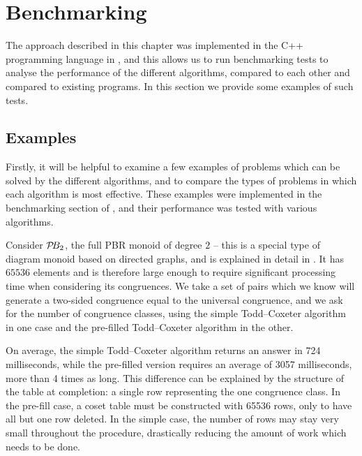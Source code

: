 \section{Benchmarking}
\label{sec:benchmarking}

The approach described in this chapter was implemented in the C++ programming
language in \libsemigroups{} \cite{libsemigroups}, and this allows us to
run benchmarking tests to analyse the performance of the different algorithms,
compared to each other and compared to existing programs.  In this section we
provide some examples of such tests.

\subsection{Examples}
Firstly, it will be helpful to examine a few examples of problems which can be
solved by the different algorithms, and to compare the types of problems in
which each algorithm is most effective.  These examples were implemented in the
benchmarking section of \libsemigroups{}, and their performance was tested
with various algorithms.

\begin{example}
  \label{ex:good-tc}
  Consider $\mathcal{P}\!B_2$, the full PBR monoid of degree $2$ -- this is a special type
  of diagram monoid based on directed graphs, and is explained in detail in
  \cite[\S2.1]{diagram_semigroups}.  It has $65536$ elements and is therefore
  large enough to require significant processing time when considering its
  congruences.  We take a set of pairs which we know will generate a two-sided
  congruence equal to the universal congruence, and we ask \libsemigroups{} for
  the number of congruence classes, using the simple Todd--Coxeter algorithm in one case and
  the pre-filled Todd--Coxeter algorithm in the other.

  On average, the simple Todd--Coxeter algorithm returns an answer in 724 milliseconds, while
  the pre-filled version requires an average of 3057 milliseconds, more than 4
  times as long.  This difference can be explained by the structure
  of the table at completion: a single row representing the one congruence
  class.  In the pre-fill case, a coset table must be constructed with 65536
  rows, only to have all but one row deleted.  In the simple case,
  the number of rows may stay very small throughout the procedure, drastically
  reducing the amount of work which needs to be done.
\end{example}

